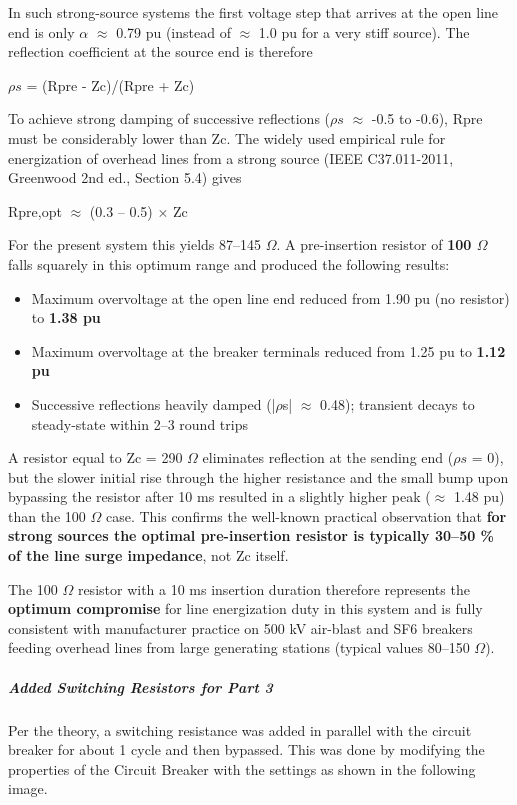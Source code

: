 In such strong-source systems the first voltage step that arrives at the open line end is only $\alpha$ $\approx$ 0.79 pu (instead of $\approx$ 1.0 pu for a very stiff source). The reflection coefficient at the source end is therefore

$\rho s$ = (Rpre - Zc)/(Rpre + Zc)

To achieve strong damping of successive reflections ($\rho s$ $\approx$ -0.5 to -0.6), Rpre must be considerably lower than Zc. The widely used empirical rule for energization of overhead lines from a strong source (IEEE C37.011-2011, Greenwood 2nd ed., Section 5.4) gives

Rpre,opt $\approx$ (0.3 -- 0.5) $\times$ Zc

For the present system this yields 87--145 $\Omega$. A pre-insertion resistor of \textbf{100 $\Omega$} falls squarely in this optimum range and produced the following results:

\begin{itemize}
\item Maximum overvoltage at the open line end reduced from 1.90 pu (no resistor) to \textbf{1.38 pu}
\item Maximum overvoltage at the breaker terminals reduced from 1.25 pu to \textbf{1.12 pu}
\item Successive reflections heavily damped (|$\rho$s| $\approx$ 0.48); transient decays to steady-state within 2--3 round trips
\end{itemize}

A resistor equal to Zc = 290 $\Omega$ eliminates reflection at the sending end ($\rho s$ = 0), but the slower initial rise through the higher resistance and the small bump upon bypassing the resistor after 10 ms resulted in a slightly higher peak ($\approx$ 1.48 pu) than the 100 $\Omega$ case. This confirms the well-known practical observation that \textbf{for strong sources the optimal pre-insertion resistor is typically 30--50 \% of the line surge impedance}, not Zc itself.

The 100 $\Omega$ resistor with a 10 ms insertion duration therefore represents the \textbf{optimum compromise} for line energization duty in this system and is fully consistent with manufacturer practice on 500 kV air-blast and SF6 breakers feeding overhead lines from large generating stations (typical values 80--150 $\Omega$).

\subparagraph{Added Switching Resistors for Part 3}

Per the theory, a switching resistance was added in parallel with the circuit breaker for about 1 cycle and then bypassed.  This was done by modifying the properties of the Circuit Breaker with the settings as shown in the following image.

